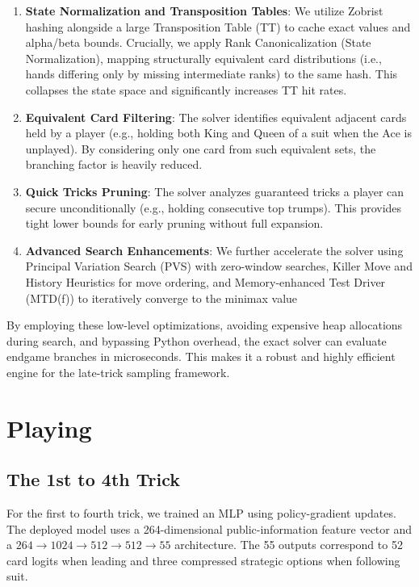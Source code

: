 \documentclass{article}
\begin{document}
\begin{enumerate}
    \item \textbf{State Normalization and Transposition Tables}: We utilize Zobrist hashing alongside a large Transposition Table (TT) to cache exact values and alpha/beta bounds. Crucially, we apply Rank Canonicalization (State Normalization), mapping structurally equivalent card distributions (i.e., hands differing only by missing intermediate ranks) to the same hash. This collapses the state space and significantly increases TT hit rates.
    \item \textbf{Equivalent Card Filtering}: The solver identifies equivalent adjacent cards held by a player (e.g., holding both King and Queen of a suit when the Ace is unplayed). By considering only one card from such equivalent sets, the branching factor is heavily reduced.
    \item \textbf{Quick Tricks Pruning}: The solver analyzes guaranteed tricks a player can secure unconditionally (e.g., holding consecutive top trumps). This provides tight lower bounds for early pruning without full expansion.
    \item \textbf{Advanced Search Enhancements}: We further accelerate the solver using Principal Variation Search (PVS) with zero-window searches, Killer Move and History Heuristics for move ordering, and Memory-enhanced Test Driver (MTD(f)) to iteratively converge to the minimax value
\end{enumerate}

By employing these low-level optimizations, avoiding expensive heap allocations during search, and bypassing Python overhead, the exact solver can evaluate endgame branches in microseconds. This makes it a robust and highly efficient engine for the late-trick sampling framework.

\section{Playing}
\label{sec:playing}

\subsection{The 1st to 4th Trick}
\label{sec:early-game}

For the first to fourth trick, we trained an MLP using policy-gradient updates. The deployed model uses a 264-dimensional public-information feature vector and a $264\to 1024\to 512\to 512\to 55$ architecture. The 55 outputs correspond to 52 card logits when leading and three compressed strategic options when following suit.
\end{document}
